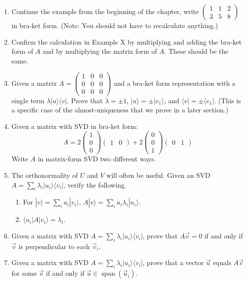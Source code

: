 \documentclass{amsbook}
\begin{document}
\begin{enumerate}
\item Continue the example from the beginning of the chapter, write $\left(
\begin{array}{ccc}
1 & 1 & 2 \\ 3 & 5 & 8
\end{array}
\right)$ in bra-ket form.  (Note: You should not have to recalculate anything.)
\item \label{Ex-Confirm SVD} Confirm the calculation in Example X by multiplying and adding the bra-ket form of $A$ and by multiplying the matrix form of $A$.  These should be the same.
\item Given a matrix $A=\left(\begin{array}{ccc}1&0&0\\0&0&0\\0&0&0\end{array}\right)$ and a bra-ket form representation with a single term $\lambda|u\rangle\langle v|$.  Prove that $\lambda=\pm 1$, $|u\rangle=\pm|e_1\rangle$, and $\langle v|=\pm\langle e_1|$.  (This is a specific case of the almost-uniqueness that we prove in a later section.)
\item \label{Ex-Rectangular bra-ket to matrix} Given a matrix with SVD in bra-ket form:
$$
A=2\left(\begin{array}{c}1\\0\\0\end{array}\right)\left(\begin{array}{cc}1&0\end{array}\right) + 2\left(\begin{array}{c}0\\0\\1\end{array}\right)\left(\begin{array}{cc}0&1\end{array}\right)
$$
Write $A$ in matrix-form SVD two different ways.
\item The orthonormality of $U$ and $V$ will often be useful.  Given an SVD $A=\sum_i\lambda_i|u_i\rangle\langle v_i|$, verify the following.
\begin{enumerate}
\item For $|v\rangle = \sum_ia_i|v_i\rangle$, $A|v\rangle=\sum_ia_i\lambda_i|u_i\rangle$.
\item $\langle u_i|A|v_i\rangle=\lambda_i$.
\end{enumerate}
\item \label{Ex-SVD Null Space} Given a matrix with SVD $A=\sum_i\lambda_i|u_i\rangle\langle v_i|$, prove that $A\vec v=0$ if and only if $\vec v$ is perpendicular to each $\vec v_i$.
\item \label{Ex-SVD Range} Given a matrix with SVD $A=\sum_i\lambda_i|u_i\rangle\langle v_i|$, prove that a vector $\vec u$ equals $A\vec v$ for some $\vec v$ if and only if $\vec u\in\operatorname{span}\left(\vec u_i\right)$.
\end{enumerate}
\end{document}
